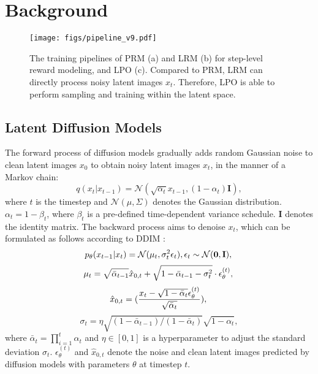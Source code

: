\section{Background}
\label{sec:background}

\begin{figure*}[t]
    \centering
    \texttt{[image: figs/pipeline\_v9.pdf]}
    \vspace{-22pt}
    \caption{The training pipelines of PRM (a) and LRM (b) for step-level reward modeling, and LPO (c). Compared to PRM, LRM can directly process noisy latent images $x_t$. Therefore, LPO is able to perform sampling and training within the latent space.}
    \label{fig:pipeline}
    \vspace{-5pt}
\end{figure*}


\subsection{Latent Diffusion Models}
The forward process of diffusion models gradually adds random Gaussian noise to clean latent images $x_0$ to obtain noisy latent images $x_t$, in the manner of a Markov chain:
\begin{equation}
    q(x_t|x_{t-1})=\mathcal{N}(\sqrt{\alpha_t}x_{t-1}, (1-\alpha_t)\mathbf{I}),
    \label{eq:diffusion_forward}
\end{equation}
where $t$ is the timestep and $\mathcal{N}(\mu,\Sigma)$ denotes the Gaussian distribution. $\alpha_t=1-\beta_t$, where $\beta_t$ is a pre-defined time-dependent variance schedule. $\mathbf{I}$ denotes the identity matrix. The backward process aims to denoise $x_t$, which can be formulated as follows according to DDIM \cite{ddim}:
\begin{equation}
    p_{\theta}(x_{t-1}|x_t)=\mathcal{N}(\mu_t, \sigma_t^2\epsilon_t), \epsilon_t \sim \mathcal{N}(\mathbf{0},\mathbf{I}), \label{eq:diffusion_backward} \\
\end{equation}
\begin{equation}
    \mu_t=\sqrt{\bar{\alpha}_{t-1}}\hat{x}_{0,t}+\sqrt{1-\bar{\alpha}_{t-1}-\sigma_t^2}\cdot\epsilon_{\theta}^{(t)}, \\
\end{equation}
\begin{equation}
    \hat{x}_{0,t}=(\frac{x_t-\sqrt{1-\bar{\alpha}_t}\epsilon_{\theta}^{(t)}}{\sqrt{\bar{\alpha}_t}}), \label{eq:predicted_x0} \\
\end{equation}
\begin{equation}
    \sigma_t=\eta\sqrt{(1-\bar{\alpha}_{t-1})/(1-\bar{\alpha}_t)}\sqrt{1-\alpha_t},
\end{equation}
where $\bar{\alpha}_t=\prod_{i=1}^t\alpha_t$ and $\eta \in [0,1]$ is a hyperparameter to adjust the standard deviation $\sigma_t$. $\epsilon_{\theta}^{(t)}$ and $\hat{x}_{0,t}$ denote the noise and clean latent images predicted by diffusion models with parameters $\theta$ at timestep $t$.


